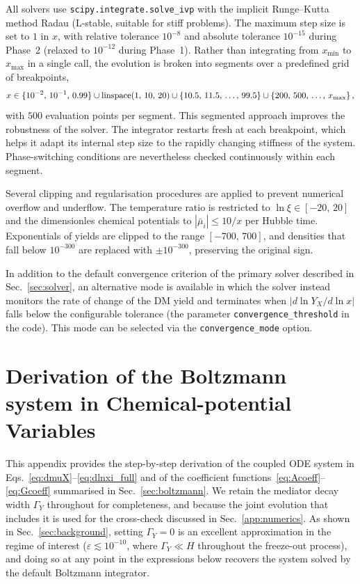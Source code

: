 \documentclass[11pt]{article}
\numberwithin{equation}{section}
\begin{document}
All solvers use \texttt{scipy.integrate.solve\_ivp} with the implicit Runge--Kutta method Radau (L-stable, suitable for stiff problems). The maximum step size is set to $1$ in $x$, with relative tolerance $10^{-8}$ and absolute tolerance $10^{-15}$ during Phase~2 (relaxed to $10^{-12}$ during Phase~1). Rather than integrating from $x_{\min}$ to $x_{\max}$ in a single call, the evolution is broken into segments over a predefined grid of breakpoints,
\begin{equation}
    x \in \{10^{-2},\, 10^{-1},\, 0.99\} \cup \mathrm{linspace}(1,\,10,\,20) \cup \{10.5,\, 11.5,\, \ldots,\, 99.5\} \cup \{200,\, 500,\, \ldots,\, x_{\rm max}\}\,,
\end{equation}
with $500$ evaluation points per segment. This segmented approach improves the robustness of the solver. The integrator restarts fresh at each breakpoint, which helps it adapt its internal step size to the rapidly changing stiffness of the system. Phase-switching conditions are nevertheless checked continuously within each segment.


Several clipping and regularisation procedures are applied to prevent numerical overflow and underflow. The temperature ratio is restricted to $\ln\xi \in [-20,\,20]$ and the dimensionles chemical potentials to $|\bar\mu_i| \leq 10/x$ per Hubble time. Exponentials of yields are clipped to the range $[-700,\,700]$, and densities that fall below $10^{-300}$ are replaced with $\pm 10^{-300}$, preserving the original sign.

In addition to the default convergence criterion of the primary solver described in Sec.~\ref{sec:solver}, an alternative mode is available in which the solver instead monitors the rate of change of the DM yield and terminates when $|d\ln Y_X/d\ln x|$ falls below the configurable tolerance (the parameter \texttt{convergence\_threshold} in the code). This mode can be selected via the \texttt{convergence\_mode} option.

\section{Derivation of the Boltzmann system in Chemical-potential Variables}
\label{app:derivation}

This appendix provides the step-by-step derivation of the coupled ODE system in Eqs.~\eqref{eq:dmuX}--\eqref{eq:dlnxi_full} and of the coefficient functions~\eqref{eq:Acoeff}--\eqref{eq:Gcoeff} summarised in Sec.~\ref{sec:boltzmann}. We retain the mediator decay width $\Gamma_Y$ throughout for completeness, and because the joint evolution that includes it is used for the cross-check discussed in Sec.~\ref{app:numerics}. As shown in Sec.~\ref{sec:background}, setting $\Gamma_Y = 0$ is an excellent approximation in the regime of interest ($\varepsilon \lesssim 10^{-10}$, where $\Gamma_Y \ll H$ throughout the freeze-out process), and doing so at any point in the expressions below recovers the system solved by the default Boltzmann integrator.
 
\end{document}
